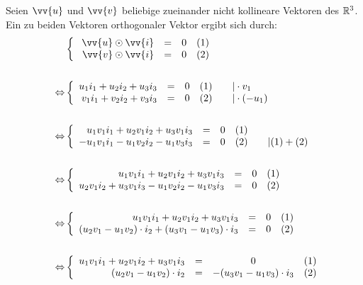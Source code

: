 \documentclass[main.tex]{subfiles}
\begin{document}
    \begin{Beweis}
        Seien $\vv{u}$ und $\vv{v}$ beliebige zueinander nicht kollineare Vektoren des $\mathbb{R}^3$. Ein zu beiden Vektoren orthogonaler Vektor ergibt sich durch: \\
        \begin{align*}
            \qquad &\left\{\begin{array}{rccl} \vv{u} \odot \vv{i} & = & 0 & (1) \\ \vv{v} \odot \vv{i} & = & 0 & (2)\end{array}\right. \\\\
            \Leftrightarrow &\left\{\begin{array}{rccl} u_1i_1 + u_2i_2 + u_3i_3 & = & 0 & (1) \qquad | \cdot v_1 \\ v_1i_1 + v_2i_2 + v_3i_3 & = & 0 & (2) \qquad | \cdot (-u_1) \end{array}\right. \\\\
            \Leftrightarrow &\left\{\begin{array}{rccl} u_1v_1i_1 + u_2v_1i_2 + u_3v_1i_3 & = & 0 & (1) \\ -u_1v_1i_1 - u_1v_2i_2 - u_1v_3i_3 & = & 0 & (2) \qquad | (1) + (2) \end{array}\right. \\\\
            \Leftrightarrow &\left\{\begin{array}{rccl} u_1v_1i_1 + u_2v_1i_2 + u_3v_1i_3 & = & 0 & (1) \\ u_2v_1i_2 + u_3v_1i_3 - u_1v_2i_2 - u_1v_3i_3 & = & 0 & (2) \end{array}\right. \\\\
            \Leftrightarrow &\left\{\begin{array}{rccl} u_1v_1i_1 + u_2v_1i_2 + u_3v_1i_3 & = & 0 & (1) \\ (u_2v_1 - u_1v_2) \cdot i_2 + (u_3v_1 - u_1v_3) \cdot i_3 & = & 0 & (2) \end{array}\right. \\\\
            \Leftrightarrow &\left\{\begin{array}{rccl} u_1v_1i_1 + u_2v_1i_2 + u_3v_1i_3 & = & 0 & (1) \\ (u_2v_1 - u_1v_2) \cdot i_2 & = & -(u_3v_1 - u_1v_3) \cdot i_3 & (2) \end{array}\right. \\\\

\end{align*}
\end{Beweis}
\end{document}
